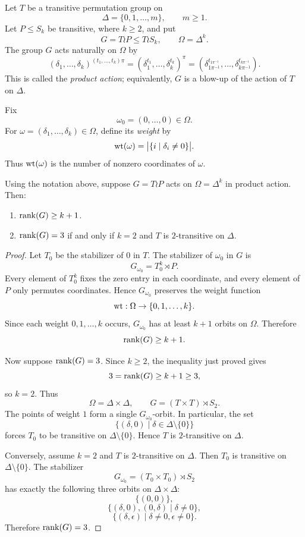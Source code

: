 \begin{definition}
Let $T$ be a transitive permutation group on
\[
    \Delta=\{0,1,\ldots,m\},\qquad m\geq 1.
\]
Let $P\leq S_k$ be transitive, where $k\geq 2$, and put
\[
    G=T\wr P\leq T\wr S_k,
    \qquad
    \Omega=\Delta^k.
\]
The group $G$ acts naturally on $\Omega$ by
\[
    (\delta_1,\ldots,\delta_k)^{(t_1,\ldots,t_k)\pi}
    = (\delta_1^{t_1},\ldots,\delta_k^{t_k})^\pi
    = (\delta_{1\pi^{-1}}^{t_{1\pi^{-1}}},\ldots,
       \delta_{k\pi^{-1}}^{t_{k\pi^{-1}}}).
\]
This is called the \emph{product action}; equivalently, $G$ is a blow-up of the action of $T$ on $\Delta$.
\end{definition}

Fix
\[
    \omega_0=(0,\ldots,0)\in\Omega.
\]
For $\omega=(\delta_1,
\ldots,
\delta_k)\in\Omega$, define its \emph{weight} by
\[
    \operatorname{wt}(\omega)=\bigl|\{i\mid \delta_i\neq 0\}\bigr|.
\]
Thus $\operatorname{wt}(\omega)$ is the number of nonzero coordinates of $\omega$.

\begin{lemma}\label{lem:product-action-rank}
Using the notation above, suppose $G=T\wr P$ acts on $\Omega=\Delta^k$ in product action.  Then:
\begin{enumerate}[label=\textup{(\arabic*)}]
    \item $\operatorname{rank}(G)\geq k+1$.
    \item $\operatorname{rank}(G)=3$ if and only if $k=2$ and $T$ is $2$-transitive on $\Delta$.
\end{enumerate}
\end{lemma}

\begin{proof}
Let $T_0$ be the stabilizer of $0$ in $T$.  The stabilizer of $\omega_0$ in $G$ is
\[
    G_{\omega_0}=T_0^k\rtimes P.
\]
Every element of $T_0^k$ fixes the zero entry in each coordinate, and every element of $P$ only permutes coordinates.  Hence $G_{\omega_0}$ preserves the weight function
\[
    \operatorname{wt}:\Omega\to\{0,1,
\ldots,k\}.
\]
Since each weight $0,1,\ldots,k$ occurs, $G_{\omega_0}$ has at least $k+1$ orbits on $\Omega$.  Therefore
\[
    \operatorname{rank}(G)\geq k+1.
\]

Now suppose $\operatorname{rank}(G)=3$.  Since $k\geq 2$, the inequality just proved gives
\[
    3=\operatorname{rank}(G)\geq k+1\geq 3,
\]
so $k=2$.  Thus
\[
    \Omega=\Delta\times\Delta,
    \qquad
    G=(T\times T)\rtimes S_2.
\]
The points of weight $1$ form a single $G_{\omega_0}$-orbit.  In particular, the set
\[
    \{(\delta,0)\mid \delta\in\Delta\setminus\{0\}\}
\]
forces $T_0$ to be transitive on $\Delta\setminus\{0\}$.  Hence $T$ is $2$-transitive on $\Delta$.

Conversely, assume $k=2$ and $T$ is $2$-transitive on $\Delta$.  Then $T_0$ is transitive on $\Delta\setminus\{0\}$.  The stabilizer
\[
    G_{\omega_0}= (T_0\times T_0)\rtimes S_2
\]
has exactly the following three orbits on $\Delta\times\Delta$:
\[
    \{(0,0)\},
\]
\[
    \{(\delta,0),(0,\delta)\mid \delta\neq 0\},
\]
\[
    \{(\delta,\epsilon)
        \mid \delta\neq 0,
        \epsilon\neq 0\}.
\]
Therefore $\operatorname{rank}(G)=3$.
\end{proof}

